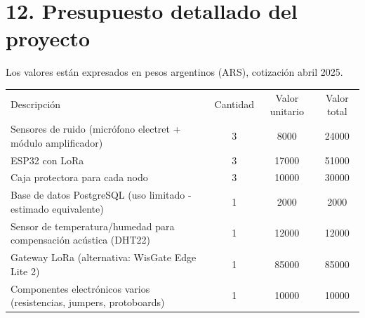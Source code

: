 \documentclass[
11pt, %
]{charter}
\begin{document}
\section{12. Presupuesto detallado del proyecto}
\label{sec:presupuesto}
Los valores están expresados en pesos argentinos (ARS), cotización abril 2025.

\begin{table}[htpb]
\centering
\begin{tabularx}{\linewidth}{@{}|X|c|r|r|@{}}
\hline
\rowcolor[HTML]{C0C0C0} 
\multicolumn{4}{|c|}{\cellcolor[HTML]{C0C0C0}COSTOS DIRECTOS} \\ \hline
\rowcolor[HTML]{C0C0C0} 
Descripción &
  \multicolumn{1}{c|}{\cellcolor[HTML]{C0C0C0}Cantidad} &
  \multicolumn{1}{c|}{\cellcolor[HTML]{C0C0C0}Valor unitario} &
  \multicolumn{1}{c|}{\cellcolor[HTML]{C0C0C0}Valor total} \\ \hline
  Sensores de ruido (micrófono electret + módulo amplificador)&
  \multicolumn{1}{c|}{3} &
  \multicolumn{1}{c|}{8000} &
  \multicolumn{1}{c|}{24000} \\ \hline
 ESP32 con LoRa&
  \multicolumn{1}{c|}{3} &
  \multicolumn{1}{c|}{17000} &
  \multicolumn{1}{c|}{51000} \\ \hline
  Caja protectora para cada nodo&
  \multicolumn{1}{c|}{3} &
  \multicolumn{1}{c|}{10000} &
  \multicolumn{1}{c|}{30000} \\ \hline
  Base de datos PostgreSQL (uso limitado - estimado equivalente)&
  \multicolumn{1}{c|}{1} &
  \multicolumn{1}{c|}{2000} &
  \multicolumn{1}{c|}{2000} \\ \hline
  Sensor de temperatura/humedad para compensación acústica (DHT22)&
  \multicolumn{1}{c|}{1} &
  \multicolumn{1}{c|}{12000} &
  \multicolumn{1}{c|}{12000} \\ \hline
  Gateway LoRa (alternativa: WisGate Edge Lite 2)&
  \multicolumn{1}{c|}{1} &
  \multicolumn{1}{c|}{85000} &
  \multicolumn{1}{c|}{85000} \\ \hline
  Componentes electrónicos varios (resistencias, jumpers, protoboards)&
  \multicolumn{1}{c|}{1} &
  \multicolumn{1}{c|}{10000} &
  \multicolumn{1}{c|}{10000} \\ \hline


\end{tabularx}
\end{table}
\end{document}
